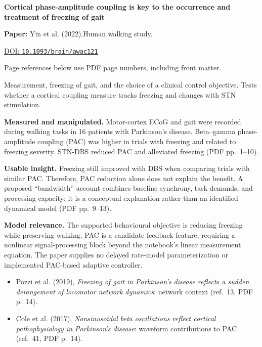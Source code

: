 

{\Large\bfseries Cortical phase-amplitude coupling is key to the occurrence and treatment of freezing of gait\par}

\textbf{Paper:} Yin et al. (2022).\quad Human walking study.\par
\href{https://doi.org/10.1093/brain/awac121}{DOI: \nolinkurl{10.1093/brain/awac121}}\par
{\footnotesize Page references below use PDF page numbers, including front matter.}

Measurement, freezing of gait, and the choice of a clinical control objective. Tests whether a cortical coupling measure tracks freezing and changes with STN stimulation.

\textbf{Measured and manipulated.} Motor-cortex ECoG and gait were recorded during walking tasks in 16 patients with Parkinson's disease. Beta--gamma phase-amplitude coupling (PAC) was higher in trials with freezing and related to freezing severity. STN-DBS reduced PAC and alleviated freezing (PDF pp.~1--10).

\textbf{Usable insight.} Freezing still improved with DBS when comparing trials with similar PAC. Therefore, PAC reduction alone does not explain the benefit. A proposed ``bandwidth'' account combines baseline synchrony, task demands, and processing capacity; it is a conceptual explanation rather than an identified dynamical model (PDF pp.~9--13).

\textbf{Model relevance.} The supported behavioural objective is reducing freezing while preserving walking. PAC is a candidate feedback feature, requiring a nonlinear signal-processing block beyond the notebook's linear measurement equation. The paper supplies no delayed rate-model parameterization or implemented PAC-based adaptive controller.

\begin{itemize}
\item Pozzi et al. (2019), \emph{Freezing of gait in Parkinson's disease reflects a sudden derangement of locomotor network dynamics}: network context (ref.~13, PDF p.~14).
\item Cole et al. (2017), \emph{Nonsinusoidal beta oscillations reflect cortical pathophysiology in Parkinson's disease}: waveform contributions to PAC (ref.~41, PDF p.~14).
\end{itemize}


